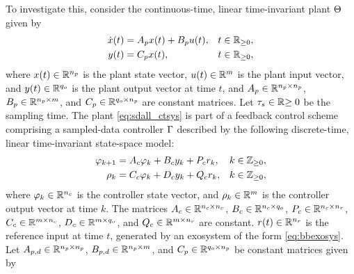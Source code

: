 To investigate this, consider the continuous-time, linear time-invariant plant $\Theta$ given by
\begin{subequations}
  \label{eq:sdall_ctsys}
  \begin{align}
    \dot{x}(t) &= A_p x(t) + B_p u(t), & t\in\mathbb{R}_{\geq 0},\\
    y(t) &= C_p x(t), & t\in\mathbb{R}_{\geq 0},
  \end{align}
\end{subequations}
where $x(t)\in\mathbb{R}^{{n_p}}$ is the plant state vector, $u(t)\in\mathbb{R}^{m}$ is the plant input vector, and $y(t)\in\mathbb{R}^{{q_o}}$ is the plant output vector at time $t$, and $A_p\in\mathbb{R}^{{n_p}\times{n_p}}$, $B_p\in\mathbb{R}^{{n_p}\times m}$, and $C_p\in\mathbb{R}^{{q_o}\times{n_p}}$ are constant matrices. Let $\tau_s\in\mathbb{R}{\geq 0}$ be the sampling time. The plant \eqref{eq:sdall_ctsys} is part of a feedback control scheme comprising a sampled-data controller $\Gamma$ described by the following discrete-time, linear time-invariant state-space model:
\begin{subequations}
  \label{eq:sdall_dtcontroller}
  \begin{align}
      \varphi_{k+1} &= A_c\varphi_k + B_cy_k + P_cr_k, & k\in\mathbb{Z}_{\geq 0},\\
      \rho_k &= C_c\varphi_k + D_cy_k + Q_cr_k, & k\in\mathbb{Z}_{\geq 0},
  \end{align}
\end{subequations}
where $\varphi_k\in\mathbb{R}^{{n_c}}$ is the controller state vector, and $\rho_k\in\mathbb{R}^{m}$ is the controller output vector at time $k$. The matrices $A_c\in\mathbb{R}^{{n_c}\times{n_c}}$, $B_c\in\mathbb{R}^{{n_c}\times{q_o}}$, $P_c\in\mathbb{R}^{{n_c}\times{n_r}}$, $C_c\in\mathbb{R}^{m\times{n_c}}$, $D_c\in\mathbb{R}^{m\times{q_o}}$, and $Q_c\in\mathbb{R}^{m\times{n_r}}$ are constant. $r(t)\in\mathbb{R}^{{n_r}}$ is the reference input at time $t$, generated by an exosystem of the form \eqref{eq:bbexosys}. Let $A_{p,d}\in\mathbb{R}^{{n_p}\times{n_p}}$, $B_{p,d}\in\mathbb{R}^{{n_p}\times m}$, and $C_p\in\mathbb{R}^{{q_o}\times{n_p}}$ be constant matrices given by
